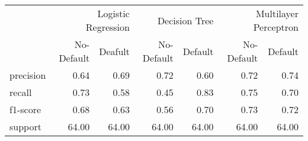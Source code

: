 \begin{table}
\thcenter
\begin{tabular}{lrrrrrr}
 & \multicolumn{2}{r}{Logistic Regression} & \multicolumn{2}{r}{Decision Tree  } & \multicolumn{2}{r}{Multilayer Perceptron} \\
 & No-Default & Deafult & No-Default & Default & No-Default & Default \\
precision & 0.64 & 0.69 & 0.72 & 0.60 & 0.72 & 0.74 \\
recall & 0.73 & 0.58 & 0.45 & 0.83 & 0.75 & 0.70 \\
f1-score & 0.68 & 0.63 & 0.56 & 0.70 & 0.73 & 0.72 \\
support & 64.00 & 64.00 & 64.00 & 64.00 & 64.00 & 64.00 \\
\end{tabular}
\end{table}
